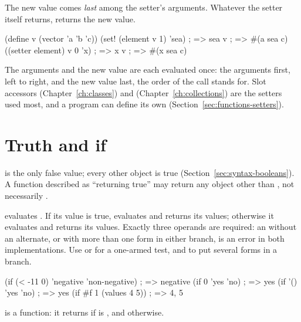 \noindent The new value comes \emph{last} among the setter's arguments.
Whatever the setter itself returns,  returns the new value.

\begin{dylan}
(define v (vector 'a 'b 'c))
(set! (element v 1) 'sea)       ; => sea
v                               ; => #(a sea c)
((setter element) v 0 'x)       ; => x
v                               ; => #(x sea c)
\end{dylan}

\noindent The arguments and the new value are each evaluated once: the
arguments first, left to right, and the new value last, the order of the
call  stands for. Slot accessors
(Chapter~\ref{ch:classes}) and  (Chapter~\ref{ch:collections}) are the
setters used most, and a program can define its own
(Section~\ref{sec:functions-setters}).

\section{Truth and if}\label{sec:control-if}

 is the only false value; every other object is true
(Section~\ref{sec:syntax-booleans}). A function described as ``returning true'' may
return any object other than , not necessarily .

\begin{quote}
\end{quote}

\noindent {} evaluates . If its value is true, 
evaluates  and returns its values; otherwise it evaluates
 and returns its values. Exactly three operands are
required: an  without an alternate, or with more than one form in
either branch, is an error in both implementations. Use  or
 for a one-armed test, and  to put several forms in
a branch.

\begin{dylan}
(if (< -11 0) 'negative 'non-negative)   ; => negative
(if 0 'yes 'no)                          ; => yes
(if '() 'yes 'no)                        ; => yes
(if #f 1 (values 4 5))                   ; => 4, 5
\end{dylan}

 is a function: it returns  if
 is , and  otherwise.

